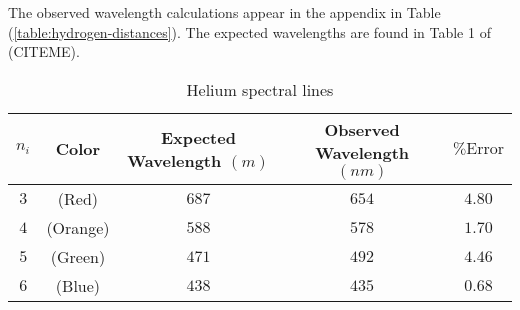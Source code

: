 \documentclass{article}
\newcommand{\pError}[0]{\ensuremath{\% \text{Error}}}
\begin{document}
The observed wavelength calculations appear in the appendix in Table (\ref{table:hydrogen-distances}).
The expected wavelengths are found in Table 1 of (CITEME).
\begin{table}[h!]
  \centering
  \begin{tabular}{ |cc|c|c|c| }
    \hline
    $n_i$ & Color & Expected Wavelength $(\si{m})$ & Observed Wavelength $(\si{nm})$ & $\pError$ \\
    \hline
    $3$ & (Red)    & $687$ & $654$ & $4.80$ \\
    $4$ & (Orange) & $588$ & $578$ & $1.70$ \\
    $5$ & (Green)  & $471$ & $492$ & $4.46$ \\
    $6$ & (Blue)   & $438$ & $435$ & $0.68$ \\
    \hline
  \end{tabular}
  \caption{
    Helium spectral lines
  }
\end{table}

\begin{figure}[H]
  \centering
\end{figure}
\end{document}
